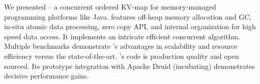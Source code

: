 
We presented \oak\/ -- a concurrent ordered KV-map for memory-managed programming platforms like Java. 
\oak\/ features off-heap memory allocation and GC, in-situ atomic data processing, zero copy API, and internal organization for high speed data access. 
It implements an intricate efficient concurrent algorithm. %
Multiple benchmarks demonstrate \oak's advantages in scalability and resource efficiency versus the state-of-the-art. 
\oak's code is production quality and open sourced. Its prototype integration with Apache Druid (incubating) demonstrates decisive 
performance gains. 